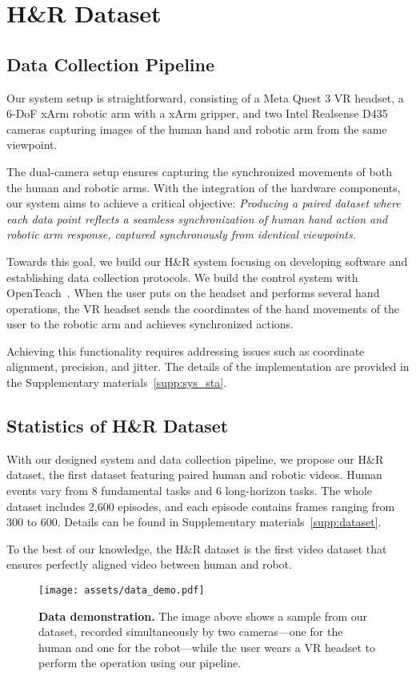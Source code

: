 \section{H\&R Dataset}
\label{sec:pipeline}
\subsection{Data Collection Pipeline}
Our system setup is straightforward, consisting of a Meta Quest 3 VR headset, a 6-DoF xArm robotic arm with a xArm gripper, and two Intel Realsense D435 cameras capturing images of the human hand and robotic arm from the same viewpoint.

The dual-camera setup ensures capturing the synchronized movements of both the human and robotic arms. With the integration of the hardware components, our system aims to achieve a critical objective:
\textit{Producing a paired dataset where each data point reflects a seamless synchronization of human hand action and robotic arm response, captured synchronously from identical viewpoints.}


Towards this goal, we build our H\&R system focusing on developing software and establishing data collection protocols. We build the control system with OpenTeach~\cite{iyer2024open}. When the user puts on the headset and performs several hand operations, the VR headset sends the coordinates of the hand movements of the user to the robotic arm and achieves synchronized actions. 

Achieving this functionality requires addressing issues such as coordinate alignment, precision, and jitter. The details of the implementation are provided in the Supplementary materials~\ref{supp:sys_sta}.

\subsection{Statistics of H\&R Dataset}
With our designed system and data collection pipeline, we propose our H\&R dataset, the first dataset featuring paired human and robotic videos. 
Human events vary from 8 fundamental tasks and 6 long-horizon tasks. The whole dataset includes 2,600 episodes, and each episode contains frames ranging from 300 to 600. Details can be found in Supplementary materials~\ref{supp:dataset}.

To the best of our knowledge, the H\&R dataset is the first video dataset that ensures perfectly aligned video between human and robot.

\begin{figure}[t]
\centering
\vspace{-0.5em}
\texttt{[image: assets/data\_demo.pdf]}
\caption{\textbf{Data demonstration.} The image above shows a sample from our dataset, recorded simultaneously by two cameras—one for the human and one for the robot—while the user wears a VR headset to perform the operation using our pipeline.}
\vspace{-1.5em}
\label{fig:data_demo}
\end{figure}

